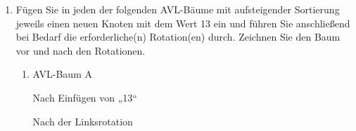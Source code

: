 \documentclass{lehramt-informatik-aufgabe}
\begin{document}
\begin{enumerate}
\begin{liDiagramm}{Nach Vertauschen von „42“ und „13“}
\end{liDiagramm}

\begin{liDiagramm}{Nach Vertauschen von „13“ und „28“}
\end{liDiagramm}


\item Fügen Sie in jeden der folgenden AVL-Bäume mit aufsteigender
Sortierung jeweils einen neuen Knoten mit dem Wert 13 ein und führen Sie
anschließend bei Bedarf die erforderliche(n) Rotation(en) durch.
Zeichnen Sie den Baum vor und nach den Rotationen.

\begin{enumerate}


\item AVL-Baum A


\begin{liDiagramm}{Nach Einfügen von „13“}
\end{liDiagramm}

\begin{liDiagramm}{Nach der Linksrotation}
\end{liDiagramm}


\end{enumerate}
\end{enumerate}
\end{document}

